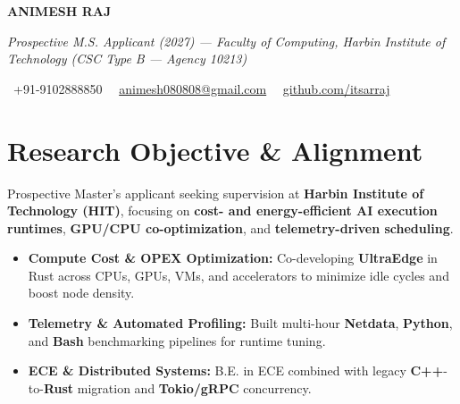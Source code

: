 \documentclass[a4paper,11pt]{article}
\newcommand{\socialicon}[1]{\raisebox{-0.05em}{\resizebox{!}{1em}{#1}}}
\newcommand{\headerfontiii}{\fontfamily{ppl}\selectfont} %
\begin{document}
\headerfontiii

\begin{center}
    {\Huge\textbf{ANIMESH RAJ}}
\end{center}
\vspace{-6mm}

\begin{center}
    {\small\textit{Prospective M.S. Applicant (2027) --- Faculty of Computing, Harbin Institute of Technology (CSC Type B — Agency 10213)}}
\end{center}
\vspace{-6mm}

\begin{center}
    {\small
    \socialicon{\faPhone}\ +91-9102888850 \textbar\ 
    \socialicon{\faEnvelope}\ \href{mailto:animesh080808@gmail.com}{animesh080808@gmail.com} \textbar\ 
    \socialicon{\faGithub}\ \href{https://github.com/itsarraj}{github.com/itsarraj}
    }
\end{center}
\vspace{-4mm}

\section{\textbf{Research Objective \& Alignment}}
\vspace{1mm}
{\small
Prospective Master's applicant seeking supervision at \textbf{Harbin Institute of Technology (HIT)}, focusing on \textbf{cost- and energy-efficient AI execution runtimes}, \textbf{GPU/CPU co-optimization}, and \textbf{telemetry-driven scheduling}.
\begin{itemize}[leftmargin=3ex, itemsep=0.4mm, topsep=1mm]
    \item \textbf{Compute Cost \& OPEX Optimization:} Co-developing \textbf{UltraEdge} in Rust across CPUs, GPUs, VMs, and accelerators to minimize idle cycles and boost node density.
    \item \textbf{Telemetry \& Automated Profiling:} Built multi-hour \textbf{Netdata}, \textbf{Python}, and \textbf{Bash} benchmarking pipelines for runtime tuning.
    \item \textbf{ECE \& Distributed Systems:} B.E. in ECE combined with legacy \textbf{C++}-to-\textbf{Rust} migration and \textbf{Tokio/gRPC} concurrency.
\end{itemize}
}
\vspace{-3mm}
\end{document}
